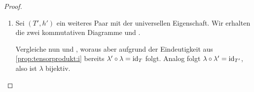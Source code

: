 \documentclass[12pt,a4paper]{scrartcl}
\theoremstyle{cplain}
\theoremstyle{cdef}
\begin{document}
\begin{proof}
\begin{enumerate}[label=\ref{prop:tensorprodukt:\roman*}]
		\item Sei $(T',h')$ ein weiteres Paar mit der universellen Eigenschaft. Wir erhalten die zwei kommutativen Diagramme  und .
		\begin{figure}[H]
			\begin{subfigure}[b]{.24\linewidth}
				\centering
				\caption{}
				\label{prop:tensorprodukt:proof:a}
			\end{subfigure}
			\begin{subfigure}[b]{.24\linewidth}
				\centering
				\caption{}
				\label{prop:tensorprodukt:proof:b}
			\end{subfigure}
			\begin{subfigure}[b]{.24\linewidth}
				\centering
				\caption{}
				\label{prop:tensorprodukt:proof:c}
			\end{subfigure}
			\begin{subfigure}[b]{.24\linewidth}
				\centering
				\caption{}
				\label{prop:tensorprodukt:proof:d}
			\end{subfigure}
		\end{figure}
		Vergleiche nun  und , woraus aber aufgrund der Eindeutigkeit aus \ref{prop:tensorprodukt:i} bereits $\lambda' \circ \lambda = \operatorname{id}_T$ folgt. Analog folgt $\lambda \circ \lambda' = \operatorname{id}_{T'}$, also ist $\lambda$ bijektiv.
		\qedhere
	\end{enumerate}
\end{proof}
\end{document}
